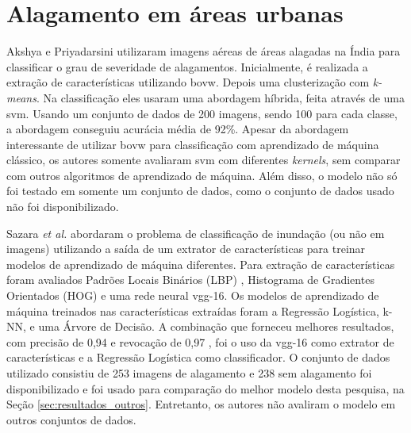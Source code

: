 \section{Alagamento em áreas urbanas}\label{sec:trabalhos_alagamento}
Akshya e Priyadarsini \cite{akshya2019} utilizaram imagens aéreas de áreas alagadas na Índia para classificar o grau de severidade de alagamentos. 
Inicialmente, é realizada a extração de características utilizando \acrfull{bovw}. Depois uma clusterização com \textit{k-means}. 
Na classificação eles usaram uma abordagem híbrida, feita através de uma \acrshort{svm}. 
Usando um conjunto de dados de 200 imagens, sendo 100 para cada classe, a abordagem conseguiu acurácia média de 92\%.
Apesar da abordagem interessante de utilizar \Acrshort{bovw} para classificação com aprendizado de máquina clássico, os autores somente avaliaram \acrshort{svm} com diferentes \textit{kernels},
sem comparar com outros algoritmos de aprendizado de máquina. Além disso, o modelo não só foi testado em somente um conjunto de dados, como o conjunto de dados usado não foi disponibilizado.

Sazara \textit{et al.} \cite{sazara2019} abordaram o problema de classificação de inundação (ou não em imagens) utilizando a saída de um extrator de características para treinar modelos de aprendizado de máquina diferentes. 
Para extração de características foram avaliados Padrões Locais Binários (LBP) , Histograma de Gradientes Orientados (HOG) e uma rede neural \acrshort{vgg}-16. 
Os modelos de aprendizado de máquina treinados nas características extraídas foram a Regressão Logística, k-NN, e uma Árvore de Decisão. 
A combinação que forneceu melhores resultados, com precisão de 0,94 e revocação de 0,97 , 
foi o uso da \acrshort{vgg}-16 como extrator de características e a Regressão Logística como classificador. 
O conjunto de dados utilizado consistiu de 253 imagens de alagamento e 238 sem alagamento foi disponibilizado e foi usado para comparação do melhor modelo desta pesquisa, na Seção \ref{sec:resultados_outros}.
Entretanto, os autores não avaliram o modelo em outros conjuntos de dados.


